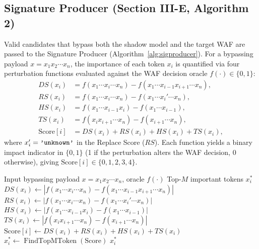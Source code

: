 \documentclass[conference]{IEEEtran}
\newcommand{\WAF}{\textsc{WAF}}
\begin{document}
\subsection{Signature Producer (Section III-E, Algorithm 2)}
Valid candidates that bypass both the shadow model and the target \WAF{} are passed to the Signature Producer (Algorithm~\ref{alg:sigproducer}). For a bypassing payload $x = x_1 x_2 \cdots x_n$, the importance of each token $x_i$ is quantified via four perturbation functions evaluated against the \WAF{} decision oracle $f(\cdot) \in \{0,1\}$:
\begin{align}
DS(x_i) &= f(x_1 \cdots x_i \cdots x_n) - f(x_1 \cdots x_{i-1}x_{i+1} \cdots x_n), \label{eq:ds}\\
RS(x_i) &= f(x_1 \cdots x_i \cdots x_n) - f(x_1 \cdots x_i' \cdots x_n), \label{eq:rs}\\
HS(x_i) &= f(x_1 \cdots x_{i-1}x_i) - f(x_1 \cdots x_{i-1}), \label{eq:hs}\\
TS(x_i) &= f(x_i x_{i+1} \cdots x_n) - f(x_{i+1} \cdots x_n), \label{eq:ts}\\
\mathrm{Score}[i] &= DS(x_i) + RS(x_i) + HS(x_i) + TS(x_i), \label{eq:score}
\end{align}
where $x_i' = \text{\texttt{'unknown'}}$ in the Replace Score ($RS$). Each function yields a binary impact indicator in $\{0,1\}$ (1 if the perturbation alters the \WAF{} decision, 0 otherwise), giving $\mathrm{Score}[i] \in \{0,1,2,3,4\}$.

\begin{algorithm}[t]
\caption{Find Important Token (Section III-E, Algorithm 2 \cite{wu2025})}
\label{alg:sigproducer}
\begin{algorithmic}[1]
\Require Input bypassing payload $x = x_1 x_2 \cdots x_n$, oracle $f(\cdot)$
\Ensure Top-$M$ important tokens $x_i^*$
    \State $DS(x_i) \gets |f(x_1 \cdots x_i \cdots x_n) - f(x_1 \cdots x_{i-1}x_{i+1} \cdots x_n)|$
    \State $RS(x_i) \gets |f(x_1 \cdots x_i \cdots x_n) - f(x_1 \cdots x_i' \cdots x_n)|$
    \State $HS(x_i) \gets |f(x_1 \cdots x_{i-1}x_i) - f(x_1 \cdots x_{i-1})|$
    \State $TS(x_i) \gets |f(x_i x_{i+1} \cdots x_n) - f(x_{i+1} \cdots x_n)|$
    \State $\mathrm{Score}[i] \gets DS(x_i) + RS(x_i) + HS(x_i) + TS(x_i)$
\EndFor
\State $x_i^* \gets \operatorname{FindTopMToken}(\mathrm{Score})$
\State \Return $x_i^*$
\end{algorithmic}
\end{algorithm}
\end{document}
